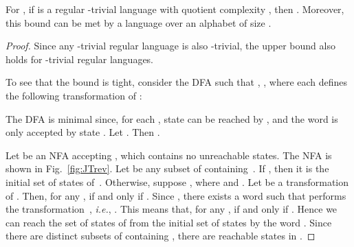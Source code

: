 \documentclass{llncs}
\newcommand{\ie}{\mbox{\it i.e.}}
\begin{document}
\begin{theorem}\label{thm:Jrev}
For , if  is a regular -trivial language with quotient complexity , then . Moreover, this bound can be met by a language  over an alphabet of size .
\end{theorem}

\begin{proof}
Since any -trivial regular language is also -trivial, the upper bound  also holds for -trivial regular languages. 

To see that the bound is tight, consider the DFA  such that , , where each  defines the following transformation of : 

The DFA  is minimal since, for each , state  can be reached by , and the word  is only accepted by state . Let . Then . 

Let  be an NFA accepting , which contains no unreachable states. The NFA  is shown in Fig.~\ref{fig:JTrev}. Let  be any subset of  containing~. If , then it is the initial set of states of~. Otherwise, suppose , where  and . Let  be a transformation of . Then, for any ,  if and only if . Since , there exists a word  such that  performs the transformation~, \ie, . This means that, for any ,  if and only if . Hence we can reach the set  of states of  from the initial set of states by the word . Since there are  distinct subsets  of  containing , there are  reachable states in . 


\end{proof}
\end{document}
